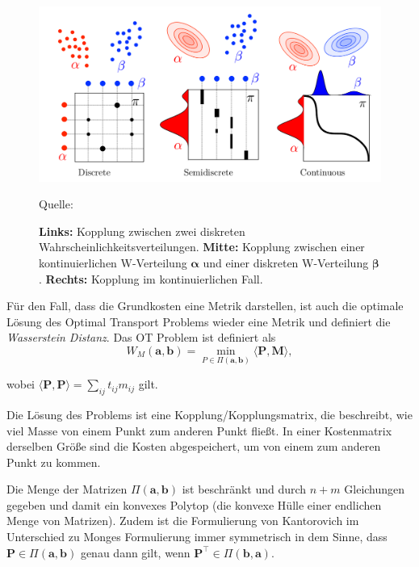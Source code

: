 \documentclass[11pt,a4paper]{article}
\newcommand{\source}[1]{\caption*{\hfill Quelle: {#1}} }
\numberwithin{equation}{section}
\begin{document}
	\begin{figure}[ht]
		\centering
		\includegraphics[width=0.4\textheight]{coupling_disc_semid_cont.png}
		\caption[Transportpläne im diskreten, semi-diskreten und kontinuierlichen Fall]{\textbf{Links: }Kopplung zwischen zwei diskreten Wahrscheinlichkeitsverteilungen. \textbf{ Mitte: }Kopplung zwischen einer kontinuierlichen W-Verteilung $\boldsymbol{\alpha}$ und einer diskreten W-Verteilung $\boldsymbol{\beta}$. \textbf{Rechts: }Kopplung im kontinuierlichen Fall.}
		\source{\cite{COTcuturi}}
		\label{im:couplings}
	\end{figure}
	
	
	
	Für den Fall, dass die Grundkosten eine Metrik darstellen, ist auch die optimale Lösung des Optimal Transport Problems wieder eine Metrik \cite{cuturi2014ground} und definiert die \textit{Wasserstein Distanz}. Das OT Problem ist definiert als
	\begin{equation}
	W_M(\boldsymbol{a},\boldsymbol{b}) = \min_{P \in \Pi(\boldsymbol{a}, \boldsymbol{b})}{\langle \boldsymbol{P}, \boldsymbol{M} \rangle},
	\end{equation}
	
	wobei ${\langle \boldsymbol{P}, \boldsymbol{P} \rangle} = \sum_{ij}{t_{ij}m_{ij}}$ gilt.
	
	Die Lösung des Problems ist eine Kopplung/Kopplungsmatrix, die beschreibt, wie viel Masse von einem Punkt zum anderen Punkt fließt. In einer Kostenmatrix derselben Größe sind die Kosten abgespeichert, um von einem zum anderen Punkt zu kommen.
	
	Die Menge der Matrizen $\Pi(\boldsymbol{a}, \boldsymbol{b})$ ist beschränkt und durch $n+m$ Gleichungen gegeben und damit ein konvexes Polytop (die konvexe Hülle einer endlichen Menge von Matrizen). Zudem ist die Formulierung von Kantorovich im Unterschied zu Monges Formulierung immer symmetrisch in dem Sinne, dass $\boldsymbol{P} \in \Pi (\boldsymbol{a}, \boldsymbol{b})$ genau dann gilt, wenn $\boldsymbol{P}^\top \in \Pi (\boldsymbol{b}, \boldsymbol{a})$.
	
\end{document}
